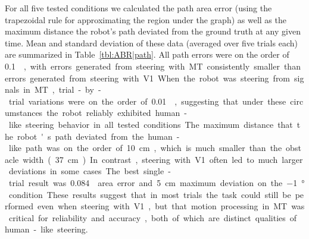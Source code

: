 
For all five tested conditions we calculated the path area error
(using the trapezoidal rule for approximating the region under
the graph) as well as the maximum distance the robot's path
deviated from the ground truth at any given time. Mean and
standard deviation of these data (averaged over five trials each)
are summarized in Table~\ref{tbl:ABR|path}. 
All path errors were on the order of
\SI{0.1}{\meter\square}, 
with errors generated from steering with \ac{MT} consistently
smaller than errors generated from steering with \ac{V1}. When the
robot was steering from signals in \ac{MT}, trial-by-trial variations were
on the order of \SI{0.01}{\meter\square}, 
suggesting that under these circumstances
the robot reliably exhibited human-like steering behavior in all
tested conditions. The maximum distance that the robot's path
deviated from the human-like path was 
on the order of \SI{10}{\centi\meter},
which is much smaller than the obstacle width (\SI{37}{\centi\meter}). 
In contrast, steering with \ac{V1} often led to much larger deviations 
in some cases.
The best single-trial result was \SI{0.084}{\meter\square} area error
and \SI{5}{\centi\meter} maximum deviation on the 
\SI{-1}{\degree} condition. These results suggest
that in most trials the task could still be performed even when
steering with \ac{V1}, but that motion processing in \ac{MT} was critical
for reliability and accuracy, both of which are distinct qualities of
human-like steering.

